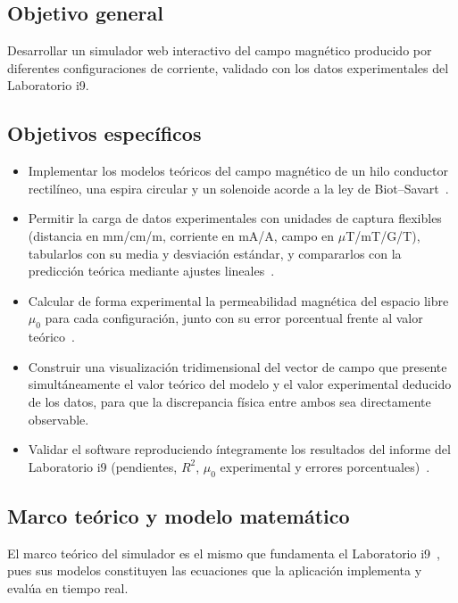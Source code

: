 \documentclass{article}
\begin{document}
\subsection{Objetivo general} \label{sec:obj_general}

Desarrollar un simulador web interactivo del campo magnético producido por diferentes configuraciones de corriente, validado con los datos experimentales del Laboratorio i9.~\cite{guiaI9}

\subsection{Objetivos específicos} \label{sec:obj_especificos}

\begin{itemize}
    \item Implementar los modelos teóricos del campo magnético de un hilo conductor rectilíneo, una espira circular y un solenoide acorde a la ley de Biot--Savart~\cite{young2009}.
    \item Permitir la carga de datos experimentales con unidades de captura flexibles (distancia en mm/cm/m, corriente en mA/A, campo en $\mu$T/mT/G/T), tabularlos con su media y desviación estándar, y compararlos con la predicción teórica mediante ajustes lineales~\cite{labi9rep}.
    \item Calcular de forma experimental la permeabilidad magnética del espacio libre $\mu_0$ para cada configuración, junto con su error porcentual frente al valor teórico~\cite{labi9rep}.
    \item Construir una visualización tridimensional del vector de campo que presente simultáneamente el valor teórico del modelo y el valor experimental deducido de los datos, para que la discrepancia física entre ambos sea directamente observable.
    \item Validar el software reproduciendo íntegramente los resultados del informe del Laboratorio i9 (pendientes, $R^2$, $\mu_0$ experimental y errores porcentuales)~\cite{labi9rep}.
\end{itemize}

\subsection{Marco teórico y modelo matemático} \label{sec:marco_teorico}

El marco teórico del simulador es el mismo que fundamenta el Laboratorio i9~\cite{labi9rep}, pues sus modelos constituyen las ecuaciones que la aplicación implementa y evalúa en tiempo real.
\end{document}
